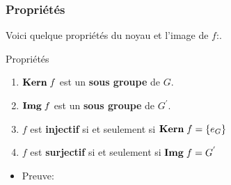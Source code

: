 \documentclass{beamer}
\begin{document}
\begin{frame}[t]
  \frametitle{Propriétés}
 Voici quelque propriétés du noyau et l'image de $f$:.

   \small
   \begin{block}{Propriétés}
 \begin{enumerate}
 \item $\text{\textbf{Kern}}\;f$ est un \textbf{sous groupe}  de $G$.\\[8pt]
 \item $\text{\textbf{Img}}\; f$ est un \textbf{sous groupe}  de $G^{'}$.\\[8pt]
 \item $f$ est \alert{\textbf{injectif}} si et seulement si $\text{\textbf{Kern}}\;f =
   \left\{e_G\right\}$\\[8pt]

 \item $f$ est \alert{\textbf{surjectif}} si et seulement si $\text{\textbf{Img}}\;f
   =G^{'}$\\[8pt]
 \end{enumerate}
 \end{block}
 \begin{itemize}
   \item Preuve:
 \end{itemize}
\end{frame}
\end{document}
